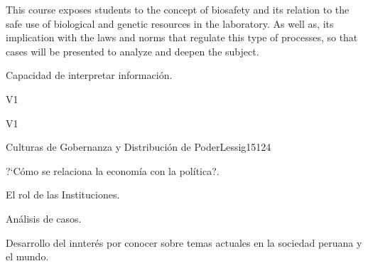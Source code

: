 \begin{syllabus}


\begin{justification}
This course exposes students to the concept of biosafety and its relation to the safe use of biological and genetic resources in the laboratory. As well as, its implication with the laws and norms that regulate this type of processes, so that cases will be presented to analyze and deepen the subject.
\end{justification}

\begin{goals}
\item Capacidad de interpretar información.
\end{goals}

\begin{outcomes}{V1}
    \item {}
    \item {}
    \item {}
    
\end{outcomes}

\begin{competences}{V1}
    \item {}
    \item {}
    \item {}
    \item {}
\end{competences}

\begin{unit}{Culturas de Gobernanza y Distribución de Poder}{}{Lessig15}{12}{4}
   \begin{topics}
      \item ?`Cómo se relaciona la economía con la política?.
      \item El rol de las Instituciones.
      \item Análisis de casos.
   \end{topics}
   \begin{learningoutcomes}
      \item Desarrollo del innterés por conocer sobre temas actuales en la sociedad peruana y el mundo.
   \end{learningoutcomes}
\end{unit}

\begin{coursebibliography}
\end{coursebibliography}

\end{syllabus}
